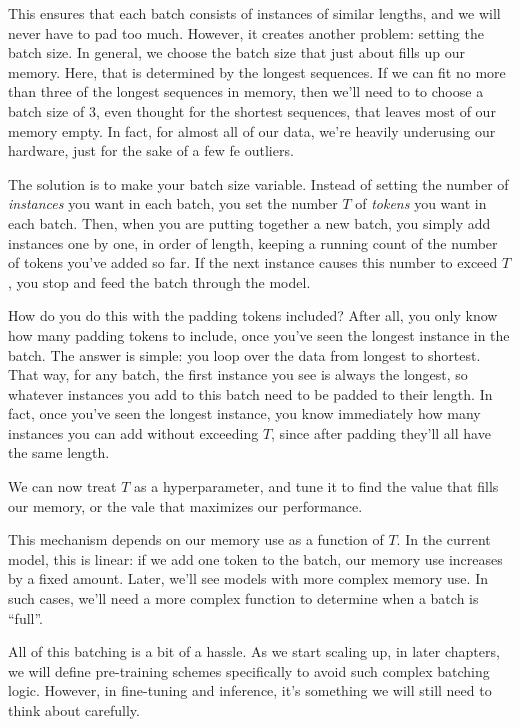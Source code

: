 \documentclass{pca}
\newenvironment{aside}{
	\setlength{\leftskip}{1em}\par\itshape
}{
	
	\setlength{\leftskip}{0em}\par
}
\theoremstyle{theorem}
\theoremstyle{definition}
\theoremstyle{proof}
\begin{document}
This ensures that each batch consists of instances of similar lengths, and we will never have to pad too much. However, it creates another problem: setting the batch size. In general, we choose the batch size that just about fills up our memory. Here, that is determined by the longest sequences. If we can fit no more than three of the longest sequences in memory, then we'll need to to choose a batch size of 3, even thought for the shortest sequences, that leaves most of our memory empty. In fact, for almost all of our data, we're heavily underusing our hardware, just for the sake of a few fe outliers.

The solution is to make your batch size variable. Instead of setting the number of \emph{instances} you want in each batch, you set the number $T$ of \emph{tokens} you want in each batch. Then, when you are putting together a new batch, you simply add instances one by one, in order of length, keeping a running count of the number of tokens you've added so far. If the next instance causes this number to exceed $T$, you stop and feed the batch through the model.

How do you do this with the padding tokens included? After all, you only know how many padding tokens to include, once you've seen the longest instance in the batch. The answer is simple: you loop over the data from longest to shortest. That way, for any batch, the first instance you see is always the longest, so whatever instances you add to this batch need to be padded to their length. In fact, once you've seen the longest instance, you know immediately how many instances you can add without exceeding $T$, since after padding they'll all have the same length. 

We can now treat $T$ as a hyperparameter, and tune it to find the value that fills our memory, or the vale that maximizes our performance.

\begin{aside}
This mechanism depends on our memory use as a function of $T$. In the current model, this is linear: if we add one token to the batch, our memory use increases by a fixed amount. Later, we'll see models with more complex memory use. In such cases, we'll need a more complex function to determine when a batch is ``full''.
\end{aside}

All of this batching is a bit of a hassle. As we start scaling up, in later chapters, we will define pre-training schemes specifically to avoid such complex batching logic. However, in fine-tuning and inference, it's something we will still need to think about carefully. 
\end{document}
